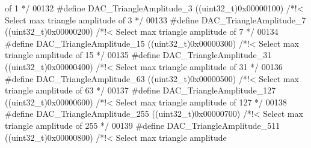 \begin{DoxyCode}
{       of 1 */}
00132 \textcolor{preprocessor}{#}\textcolor{preprocessor}{define} \textcolor{preprocessor}{DAC\_TriangleAmplitude\_3}            \textcolor{preprocessor}{(}\textcolor{preprocessor}{(}\textcolor{preprocessor}{uint32\_t}\textcolor{preprocessor}{)}0x00000100\textcolor{preprocessor}{)} \textcolor{comment}{/*!< Select max triangle amplitude
       of 3 */}
00133 \textcolor{preprocessor}{#}\textcolor{preprocessor}{define} \textcolor{preprocessor}{DAC\_TriangleAmplitude\_7}            \textcolor{preprocessor}{(}\textcolor{preprocessor}{(}\textcolor{preprocessor}{uint32\_t}\textcolor{preprocessor}{)}0x00000200\textcolor{preprocessor}{)} \textcolor{comment}{/*!< Select max triangle amplitude
       of 7 */}
00134 \textcolor{preprocessor}{#}\textcolor{preprocessor}{define} \textcolor{preprocessor}{DAC\_TriangleAmplitude\_15}           \textcolor{preprocessor}{(}\textcolor{preprocessor}{(}\textcolor{preprocessor}{uint32\_t}\textcolor{preprocessor}{)}0x00000300\textcolor{preprocessor}{)} \textcolor{comment}{/*!< Select max triangle amplitude
       of 15 */}
00135 \textcolor{preprocessor}{#}\textcolor{preprocessor}{define} \textcolor{preprocessor}{DAC\_TriangleAmplitude\_31}           \textcolor{preprocessor}{(}\textcolor{preprocessor}{(}\textcolor{preprocessor}{uint32\_t}\textcolor{preprocessor}{)}0x00000400\textcolor{preprocessor}{)} \textcolor{comment}{/*!< Select max triangle amplitude
       of 31 */}
00136 \textcolor{preprocessor}{#}\textcolor{preprocessor}{define} \textcolor{preprocessor}{DAC\_TriangleAmplitude\_63}           \textcolor{preprocessor}{(}\textcolor{preprocessor}{(}\textcolor{preprocessor}{uint32\_t}\textcolor{preprocessor}{)}0x00000500\textcolor{preprocessor}{)} \textcolor{comment}{/*!< Select max triangle amplitude
       of 63 */}
00137 \textcolor{preprocessor}{#}\textcolor{preprocessor}{define} \textcolor{preprocessor}{DAC\_TriangleAmplitude\_127}          \textcolor{preprocessor}{(}\textcolor{preprocessor}{(}\textcolor{preprocessor}{uint32\_t}\textcolor{preprocessor}{)}0x00000600\textcolor{preprocessor}{)} \textcolor{comment}{/*!< Select max triangle amplitude
       of 127 */}
00138 \textcolor{preprocessor}{#}\textcolor{preprocessor}{define} \textcolor{preprocessor}{DAC\_TriangleAmplitude\_255}          \textcolor{preprocessor}{(}\textcolor{preprocessor}{(}\textcolor{preprocessor}{uint32\_t}\textcolor{preprocessor}{)}0x00000700\textcolor{preprocessor}{)} \textcolor{comment}{/*!< Select max triangle amplitude
       of 255 */}
00139 \textcolor{preprocessor}{#}\textcolor{preprocessor}{define} \textcolor{preprocessor}{DAC\_TriangleAmplitude\_511}          \textcolor{preprocessor}{(}\textcolor{preprocessor}{(}\textcolor{preprocessor}{uint32\_t}\textcolor{preprocessor}{)}0x00000800\textcolor{preprocessor}{)} \textcolor{comment}{/*!< Select max triangle amplitude
}
\end{DoxyCode}
